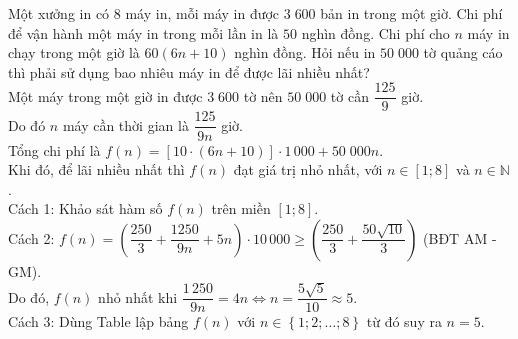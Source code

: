 \begin{ex}%
 Một xưởng in có $8$ máy in, mỗi máy in được $3\;600$ bản in trong một giờ. Chi phí để vận hành một máy in trong mỗi lần in là $50$ nghìn đồng. Chi phí cho $n$ máy in chạy trong một giờ là $60(6n+10)$ nghìn đồng. Hỏi nếu in $50\;000$ tờ quảng cáo thì phải sử dụng bao nhiêu máy in để được lãi nhiều nhất?	\\
 \loigiai
 {Một máy trong một giờ in được $3\;600$ tờ nên $50\;000$ tờ cần $\dfrac{125}{9}$ giờ.\\
 Do đó $n$ máy cần thời gian là $\dfrac{125}{9n}$ giờ.\\
 Tổng chi phí là $f(n)=\left[10\cdot \left(6n+10\right)\right]\cdot 1\,000+50\;000n$.\\
 Khi đó, để lãi nhiều nhất thì $f(n)$ đạt giá trị nhỏ nhất, với $n\in \left[1;8\right]$ và $n\in \mathbb{N}$.\\
 Cách 1: Khảo sát hàm số $f(n)$ trên miền $[1;8]$.\\
 Cách 2: $f(n)=\left(\dfrac{250}{3}+\dfrac{1250}{9n}+5n\right)\cdot 10\,000\geq \left(\dfrac{250}{3}+\dfrac{50\sqrt{10}}{3}\right)$ (BĐT AM - GM).\\
 Do đó, $f(n)$ nhỏ nhất khi $\dfrac{1\,250}{9n}=4n\Leftrightarrow n =\dfrac{5\sqrt{5}}{10}\approx 5$.\\
 Cách 3: Dùng Table lập bảng $f(n)$ với $n\in \left\{1; 2; \ldots ; 8\right\}$ từ đó suy ra $n=5$.
 }
\end{ex}